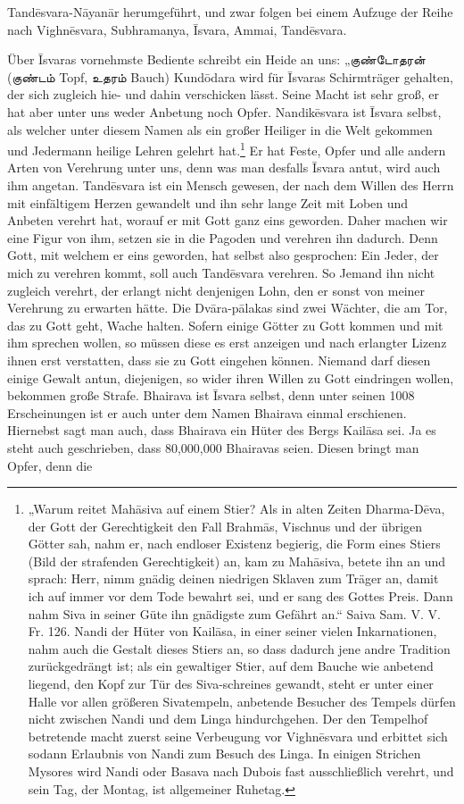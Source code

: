 \documentclass{article}
\newcommand{\TamilText}[1]{\texttamil{#1}}
\newcommand{\tam}[1]{\TamilText{#1}}
\begin{document}
Tand\={e}svara-N\={a}yan\={a}r herumgeführt, und zwar folgen bei einem Aufzuge der Reihe nach Vighn\={e}svara, Subhramanya, \={I}svara, Ammai, Tand\={e}svara.

Über \={I}svaras vornehmste Bediente schreibt ein Heide an uns: „\tam{குண்டோதரன்} (\tam{குண்டம்} Topf, \tam{உதரம்} Bauch) Kund\={o}dara wird für \={I}svaras Schirmträger gehalten, der sich zugleich hie- und dahin verschicken lässt. Seine Macht ist sehr groß, er hat aber unter uns weder Anbetung noch Opfer. Nandik\={e}svara ist \={I}svara selbst, als welcher unter diesem Namen als ein großer Heiliger in die Welt gekommen und Jedermann heilige Lehren gelehrt hat.\footnote{„Warum reitet Mah\={a}siva auf einem Stier? Als in alten Zeiten Dharma-D\={e}va, der Gott der Gerechtigkeit den Fall Brahm\={a}s, Vischnus und der übrigen Götter sah, nahm er, nach endloser Existenz begierig, die Form eines Stiers (Bild der strafenden Gerechtigkeit) an, kam zu Mah\={a}siva, betete ihn an und sprach: Herr, nimm gnädig deinen niedrigen Sklaven zum Träger an, damit ich auf immer vor dem Tode bewahrt sei, und er sang des Gottes Preis. Dann nahm Siva in seiner Güte ihn gnädigste zum Gefährt an.“ Saiva Sam. V. V. Fr. 126. Nandi der Hüter von Kail\={a}sa, in einer seiner vielen Inkarnationen, nahm auch die Gestalt dieses Stiers an, so dass dadurch jene andre Tradition zurückgedrängt ist; als ein gewaltiger Stier, auf dem Bauche wie anbetend liegend, den Kopf zur Tür des Siva-schreines gewandt, steht er unter einer Halle vor allen größeren Sivatempeln, anbetende Besucher des Tempels dürfen nicht zwischen Nandi und dem Linga hindurchgehen. Der den Tempelhof betretende macht zuerst seine Verbeugung vor Vighn\={e}svara und erbittet sich sodann Erlaubnis von Nandi zum Besuch des Linga. In einigen Strichen Mysores wird Nandi oder Basava nach Dubois fast ausschließlich verehrt, und sein Tag, der Montag, ist allgemeiner Ruhetag.} Er hat Feste, Opfer und alle andern Arten von Verehrung unter uns, denn was man desfalls \={I}svara antut, wird auch ihm angetan. Tand\={e}svara ist ein Mensch gewesen, der nach dem Willen des Herrn mit einfältigem Herzen gewandelt und ihn sehr lange Zeit mit Loben und Anbeten verehrt hat, worauf er mit Gott ganz eins geworden. Daher machen wir eine Figur von ihm, setzen sie in die Pagoden und verehren ihn dadurch. Denn Gott, mit welchem er eins geworden, hat selbst also gesprochen: Ein Jeder, der mich zu verehren kommt, soll auch Tand\={e}svara verehren. So Jemand ihn nicht zugleich verehrt, der erlangt nicht denjenigen Lohn, den er sonst von meiner Verehrung zu erwarten hätte. Die Dv\={a}ra-p\={a}lakas sind zwei Wächter, die am Tor, das zu Gott geht, Wache halten. Sofern einige Götter zu Gott kommen und mit ihm sprechen wollen, so müssen diese es erst anzeigen und nach erlangter Lizenz ihnen erst verstatten, dass sie zu Gott eingehen können. Niemand darf diesen einige Gewalt antun, diejenigen, so wider ihren Willen zu Gott eindringen wollen, bekommen große Strafe. Bhairava ist \={I}svara selbst, denn unter seinen 1008 Erscheinungen ist er auch unter dem Namen Bhairava einmal erschienen. Hiernebst sagt man auch, dass Bhairava ein Hüter des Bergs Kail\={a}sa sei. Ja es steht auch geschrieben, dass 80,000,000 Bhairavas seien. Diesen bringt man Opfer, denn die 
\end{document}
